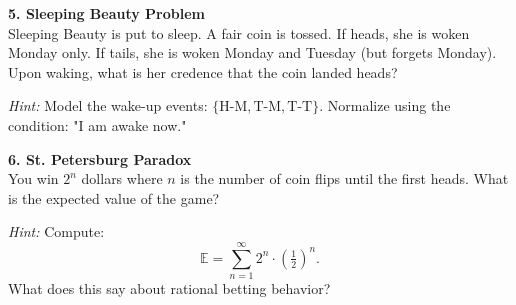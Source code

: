 {\vspace{1em}
\textbf{5. Sleeping Beauty Problem} \\[0.5em]
Sleeping Beauty is put to sleep. A fair coin is tossed. If heads, she is woken Monday only. If tails, she is woken Monday and Tuesday (but forgets Monday). Upon waking, what is her credence that the coin landed heads?

\textit{Hint:} Model the wake-up events: \( \{\text{H-M}, \text{T-M}, \text{T-T}\} \). Normalize using the condition: "I am awake now."


\vspace{1em}
\textbf{6. St. Petersburg Paradox} \\[0.5em]
You win \( 2^n \) dollars where \( n \) is the number of coin flips until the first heads. What is the expected value of the game?

\textit{Hint:} Compute:
\[
\mathbb{E} = \sum_{n=1}^\infty 2^n \cdot \left(\tfrac{1}{2}\right)^n.
\]
What does this say about rational betting behavior?
}
